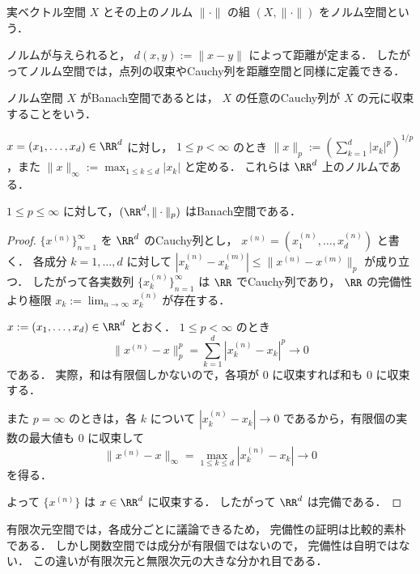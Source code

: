\begin{definition}[ノルム空間]
実ベクトル空間 $X$ とその上のノルム $\|\cdot\|$ の組 $(X,\|\cdot\|)$ をノルム空間という．
\end{definition}

\begin{remark}
ノルムが与えられると，
$d(x,y):=\|x-y\|$ によって距離が定まる．
したがってノルム空間では，点列の収束やCauchy列を距離空間と同様に定義できる．
\end{remark}

\begin{definition}[Banach空間]
ノルム空間 $X$ がBanach空間であるとは，
$X$ の任意のCauchy列が $X$ の元に収束することをいう．
\end{definition}

\begin{example}
$x=(x_1,\dots,x_d)\in\RR^d$ に対し，
$1\le p<\infty$ のとき $\|x\|_p:=\left(\sum_{k=1}^d |x_k|^p\right)^{1/p}$，また $\|x\|_\infty:=\max_{1\le k\le d}|x_k|$ と定める．
これらは $\RR^d$ 上のノルムである．
\end{example}

\begin{proposition}
$1\le p\le\infty$ に対して，$(\RR^d,\|\cdot\|_p)$ はBanach空間である．
\end{proposition}
\begin{proof}
$\{x^{(n)}\}_{n=1}^{\infty}$ を $\RR^d$ のCauchy列とし，
$x^{(n)}=(x_1^{(n)},\dots,x_d^{(n)})$ と書く．
各成分 $k=1,\dots,d$ に対して
$|x_k^{(n)}-x_k^{(m)}|\le \|x^{(n)}-x^{(m)}\|_p$ が成り立つ．
したがって各実数列 $\{x_k^{(n)}\}_{n=1}^{\infty}$ は $\RR$ でCauchy列であり，
$\RR$ の完備性より極限 $x_k:=\lim_{n\to\infty}x_k^{(n)}$ が存在する．

$x:=(x_1,\dots,x_d)\in\RR^d$ とおく．
$1\le p<\infty$ のとき
\[
\|x^{(n)}-x\|_p^p
=
\sum_{k=1}^d |x_k^{(n)}-x_k|^p
\to 0
\]
である．
実際，和は有限個しかないので，各項が $0$ に収束すれば和も $0$ に収束する．

また $p=\infty$ のときは，各 $k$ について
$|x_k^{(n)}-x_k|\to 0$ であるから，有限個の実数の最大値も $0$ に収束して
\[
\|x^{(n)}-x\|_\infty
=
\max_{1\le k\le d}|x_k^{(n)}-x_k|
\to 0
\]
を得る．

よって $\{x^{(n)}\}$ は $x\in\RR^d$ に収束する．
したがって $\RR^d$ は完備である．
\end{proof}

\begin{remark}
有限次元空間では，各成分ごとに議論できるため，
完備性の証明は比較的素朴である．
しかし関数空間では成分が有限個ではないので，
完備性は自明ではない．
この違いが有限次元と無限次元の大きな分かれ目である．
\end{remark}


